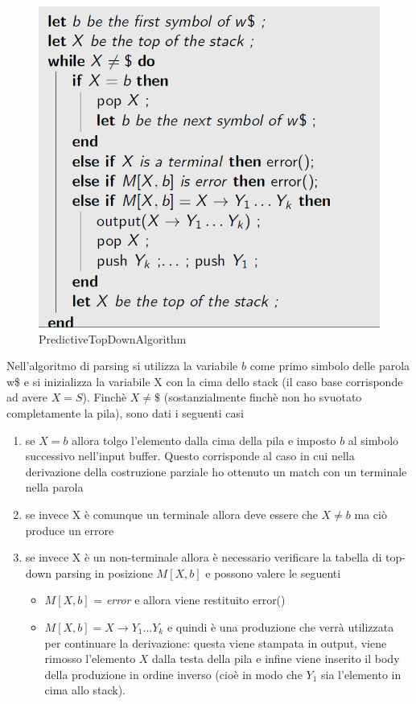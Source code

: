 \documentclass[class=book, crop=false, oneside, 12pt]{standalone}
\begin{document}
\begin{figure}[h]
    \centering
    \includegraphics[width=.7\textwidth,keepaspectratio]{PredictiveTopDownAlgorithm.png}
    \caption{PredictiveTopDownAlgorithm}
    \label{PredictiveTopDownAlgorithm}
\end{figure}

Nell'algoritmo di parsing si utilizza la variabile \(b\) come primo simbolo delle parola w\$ e si inizializza la variabile X con la cima dello stack (il caso base corrisponde ad avere \(X = S\)). Finchè \(X \neq \$\) (sostanzialmente finchè non ho svuotato completamente la pila), sono dati i seguenti casi

\begin{enumerate}
    \item se \(X = b\) allora tolgo l'elemento dalla cima della pila e imposto \(b\) al simbolo successivo nell'input buffer. Questo corrisponde al caso in cui nella derivazione della costruzione parziale ho ottenuto un match con un terminale nella parola
    \item se invece X è comunque un terminale allora deve essere che \(X \neq b\) ma ciò produce un errore
    \item se invece X è un non-terminale allora è necessario verificare la tabella di top-down parsing in posizione \(M[X, b]\) e possono valere le seguenti
    \begin{itemize}
        \item \(M[X, b]\) = \emph{error} e allora viene restituito error()
        \item \(M[X, b] = X \rightarrow Y_1...Y_k\) e quindi è una produzione che verrà utilizzata per continuare la derivazione: questa viene stampata in output, viene rimosso l'elemento \(X\) dalla testa della pila e infine viene inserito il body della produzione in ordine inverso (cioè in modo che \(Y_1\) sia l'elemento in cima allo stack).
    \end{itemize}
\end{enumerate}
\end{document}
